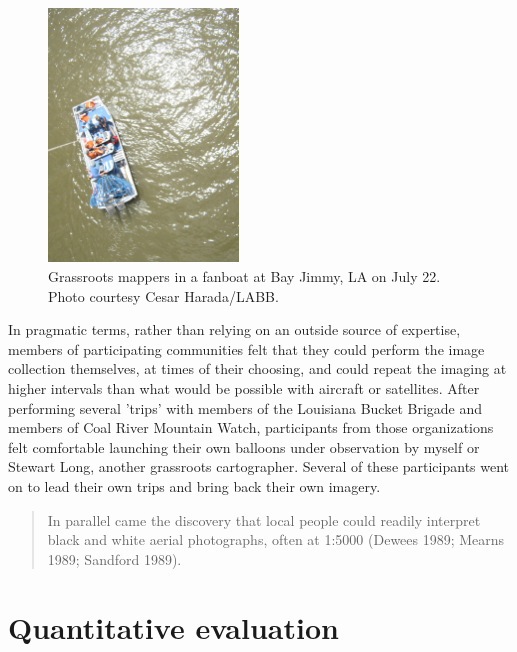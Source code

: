 \documentclass[11pt,oneside,notitlepage]{report}
\begin{document}
\begin{figure}
	\begin{flushright}
		\includegraphics[width=0.45\textwidth]{images/labb-bay-jimmy.jpg}
		\caption{Grassroots mappers in a fanboat at Bay Jimmy, LA on July 22. Photo courtesy Cesar Harada/LABB.}
	\end{flushright}
\end{figure}

In pragmatic terms, rather than relying on an outside source of expertise, members of participating communities felt that they could perform the image collection themselves, at times of their choosing, and could repeat the imaging at higher intervals than what would be possible with aircraft or satellites. After performing several 'trips' with members of the Louisiana Bucket Brigade and members of Coal River Mountain Watch, participants from those organizations felt comfortable launching their own balloons under observation by myself or Stewart Long, another grassroots cartographer. Several of these participants went on to lead their own trips and bring back their own imagery.

\begin{quote}
In parallel came the discovery that local people could readily interpret black and white aerial photographs, often at 1:5000 (Dewees 1989; Mearns 1989; Sandford 1989). 
\cite{chambers2006participatory}
\end{quote}


\section{Quantitative evaluation}

\end{document}
